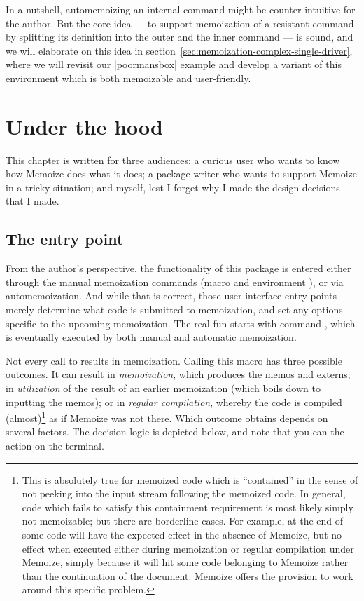 \documentclass[a4paper,11pt]{article}
\begin{document}
In a nutshell, automemoizing an internal command might be counter-intuitive for
the author.  But the core idea --- to support memoization of a resistant
command by splitting its definition into the outer and the inner command --- is
sound, and we will elaborate on this idea in
section~\ref{sec:memoization-complex-single-driver}, where we will revisit our
|poormansbox| example and develop a variant of this environment which is both
memoizable and user-friendly.


\section{Under the hood}
\label{sec:under-the-hood}

This chapter is written for three audiences: a curious user who wants to
know how Memoize does what it does; a package writer who wants to support
Memoize in a tricky situation; and myself, lest I forget why I made the design
decisions that I made.

\subsection{The entry point}
\label{sec:Memoize}


From the author's perspective, the functionality of this package is entered
either through the manual memoization commands (macro  and
environment ), or via automemoization.  And while that is
correct, those user interface entry points merely determine what code is
submitted to memoization, and set any options specific to the upcoming
memoization.  The real fun starts with command , which
is eventually executed by both manual and automatic memoization.

Not every call to  results in memoization.  Calling this macro
has three possible outcomes.  It can result in \emph{memoization}, which
produces the memos and externs; in \emph{utilization} of the result of an
earlier memoization (which boils down to inputting the memos); or in
\emph{regular compilation}, whereby the code is compiled
(almost)\footnote{\label{fn:regular-compilation-almost}This is absolutely true
  for memoized code which is ``contained'' in the sense of not peeking into the
  input stream following the memoized code.  In general, code which fails to
  satisfy this containment requirement is most likely simply not memoizable;
  but there are borderline cases.  For example,  at the
  end of some code will have the expected effect in the absence of Memoize, but
  no effect when executed either during memoization or regular compilation
  under Memoize, simply because it will hit some code belonging to Memoize
  rather than the continuation of the document.  Memoize offers the
   provision to work around this specific problem.} as if
Memoize was not there.  Which outcome obtains depends on several factors.  The
decision logic is depicted below, and note that you can  the
action on the terminal.
\end{document}
